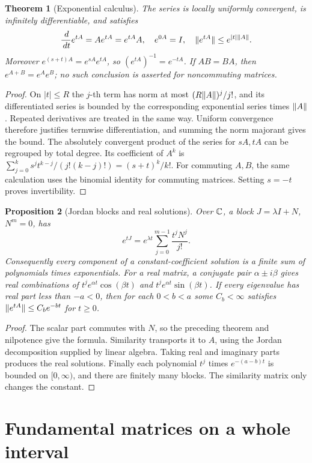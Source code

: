\documentclass[11pt,oneside]{book}
\newtheorem{theorem}{Theorem}[chapter]
\newtheorem{proposition}[theorem]{Proposition}
\theoremstyle{definition}
\theoremstyle{remark}\newtheorem{remark}[theorem]{Remark}
\newcommand{\dd}{\,d}\newcommand{\id}{\operatorname{id}}
\begin{document}
\begin{theorem}[Exponential calculus]\label{d13:07:exp}
The series is locally uniformly convergent, is infinitely differentiable,
and satisfies
\[
 \frac{\dd}{\dd t}e^{tA}=Ae^{tA}=e^{tA}A,\quad e^{0A}=I,\quad
 \norm{e^{tA}}\le e^{|t|\norm A}.
\]
Moreover \(e^{(s+t)A}=e^{sA}e^{tA}\), so \((e^{tA})^{-1}=e^{-tA}\).
If \(AB=BA\), then \(e^{A+B}=e^Ae^B\); no such conclusion is asserted for
noncommuting matrices.
\end{theorem}
\begin{proof}
On \(|t|\le R\) the \(j\)-th term has norm at most
\((R\lVert A\rVert)^j/j!\), and its differentiated series is bounded by the
corresponding exponential series times \(\lVert A\rVert\). Repeated derivatives
are treated in the same way. Uniform convergence therefore justifies
termwise differentiation, and summing the norm majorant gives the bound.
The absolutely convergent product of the series for \(sA,tA\) can be
regrouped by total degree. Its coefficient of \(A^k\) is
\(\sum_{j=0}^k s^j t^{k-j}/(j!(k-j)!)=(s+t)^k/k!\).
For commuting \(A,B\), the same calculation uses the binomial identity for
commuting matrices. Setting \(s=-t\) proves invertibility.
\end{proof}

\begin{proposition}[Jordan blocks and real solutions]\label{d13:07:jordan}
Over \(\mathbb C\), a block \(J=\lambda I+N\), \(N^m=0\), has
\[
 e^{tJ}=e^{\lambda t}\sum_{j=0}^{m-1}\frac{t^jN^j}{j!}.
\]
Consequently every component of a constant-coefficient solution is a finite
sum of polynomials times exponentials. For a real matrix, a conjugate pair
\(\alpha\pm i\beta\) gives real combinations of
\(t^j e^{\alpha t}\cos(\beta t)\) and
\(t^j e^{\alpha t}\sin(\beta t)\).
If every eigenvalue has real part less than \(-a<0\), then for each
\(0<b<a\) some \(C_b<\infty\) satisfies
\(\lVert e^{tA}\rVert\le C_b e^{-bt}\) for \(t\ge0\).
\end{proposition}
\begin{proof}
The scalar part commutes with \(N\), so the preceding theorem and nilpotence
give the formula. Similarity transports it to \(A\), using the Jordan
decomposition supplied by linear algebra. Taking real and imaginary parts
produces the real solutions. Finally each polynomial \(t^j\) times
\(e^{-(a-b)t}\) is bounded on \([0,\infty)\), and there are finitely many
blocks. The similarity matrix only changes the constant.
\end{proof}

\section{Fundamental matrices on a whole interval}
\end{document}
